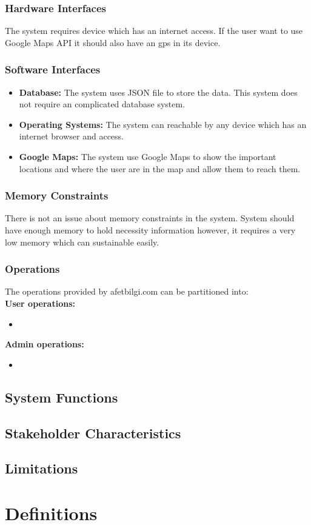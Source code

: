 \subsubsection{Hardware Interfaces}

The system requires device which has an internet access. If the user want to use Google Maps API it should also have an gps in its device.

\subsubsection{Software Interfaces}

\begin{itemize}
    \item \textbf{Database: } The system uses JSON file to store the data. This system does not require an complicated database system.
    \item \textbf{Operating Systems: } The system can reachable by any device which has an internet browser and access.
    \item \textbf{Google Maps: } The system use Google Maps to show the important locations and where the user are in the map and allow them to reach them.
\end{itemize}

\subsubsection{Memory Constraints}

There is not an issue about memory constraints in the system. System should have enough memory to hold necessity information however, it requires a very low memory which can sustainable easily. 

\subsubsection{Operations}

The operations provided by afetbilgi.com can be partitioned into: \\

\textbf{User operations: }

\begin{itemize}
    \item 
\end{itemize}

\textbf{Admin operations: }
\begin{itemize}
    \item 
\end{itemize}



\subsection{System Functions}

\subsection{Stakeholder Characteristics}

\subsection{Limitations}

\section{Definitions}